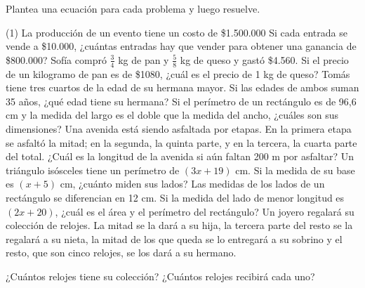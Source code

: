 \documentclass[options]{plantilla-material-v1}
\begin{document}
Plantea una ecuación para cada problema y luego resuelve.
\begin{ejercicios}(1)
  \ejercicio La producción de un evento tiene un costo de \$1.500.000 Si cada entrada
  se vende a \$10.000, ¿cuántas entradas hay que vender para obtener una ganancia de 
  \$800.000?
  \ejercicio Sofía compró $\frac{3}{4}$ kg de pan y $\frac{5}{8}$ kg de queso y gastó
  \$4.560. Si el precio de un kilogramo de pan es de \$1080, ¿cuál es el precio
  de 1 kg de queso?
  \ejercicio Tomás tiene tres cuartos de la edad de su hermana mayor. Si las 
  edades de ambos suman 35 años, ¿qué edad tiene su hermana?
  \ejercicio Si el perímetro de un rectángulo es de 96,6 cm y la medida del largo es el
  doble que la medida del ancho, ¿cuáles son sus dimensiones?
  \ejercicio Una avenida está siendo asfaltada por etapas. En la primera etapa se asfaltó
  la mitad; en la segunda, la quinta parte, y en la tercera, la cuarta parte del total.
  ¿Cuál es la longitud de la avenida si aún faltan 200 m por asfaltar?
  \ejercicio Un triángulo isósceles tiene un perímetro de $(3x+19)$ cm. Si la medida de su
  base es $(x+5)$ cm, ¿cuánto miden sus lados?
  \ejercicio Las medidas de los lados de un rectángulo se diferencian en 12 cm. Si la 
  medida del lado de menor longitud es $(2x+20)$, ¿cuál es el área y el perímetro del
  rectángulo?
  \ejercicio Un joyero regalará su colección de relojes. La mitad se la dará a su hija,
  la tercera parte del resto se la regalará a su nieta, la mitad de los que queda se lo
  entregará a su sobrino y el resto, que son cinco relojes, se los dará a su hermano.
  \begin{preguntas}
    \pregunta ¿Cuántos relojes tiene su colección?
    \pregunta ¿Cuántos relojes recibirá cada uno?
  \end{preguntas}
\end{ejercicios}
\end{document}

